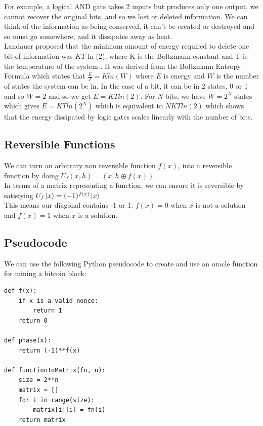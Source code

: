 \documentclass[11pt]{article} %
\begin{document}
\noindent For example, a logical AND gate takes 2 inputs but produces only one output, we cannot recover the original bits, and so we lost or deleted information.  We can think of the information as being conserved, it can't be created or destroyed and so must go somewhere, and it dissipates away as heat.\\

\noindent Landauer proposed that the minimum amount of energy required to delete one bit of information was $K T$ ln (2), where K is the Boltzmann constant and T is the temperature of the system \cite{19}. It was derived from the Boltzmann Entropy Formula which states that $\frac{E}{T} = K ln(W)$ where $E$ is energy and $W$ is the number of states the system can be in. In the case of a bit, it can be in 2 states, 0 or 1 and so $W = 2$ and so we get $E = K T ln(2)$. For $N$ bits, we have $W = 2^{N}$ states which gives $E = K T ln(2^N)$ which is equivalent to $N K T ln (2)$ which shows that the energy dissipated by logic gates scales linearly with the number of bits.\\

\subsection{Reversible Functions}{}


\noindent We can turn an arbitrary non reversible function $f(x)$, into a reversible function by doing $U_{f} (x, h) = (x, h \oplus  f(x))$. \\

\noindent In terms of a matrix representing a function, we can ensure it is reversible by satisfying $U_f \ket{x} = (-1)^{f(x)} \ket{x}$\\

\noindent This means our diagonal contains -1 or 1. $f(x) = 0$ when $x$ is not a solution and $f(x) = 1$ when $x$ is a solution.

 \subsection{Pseudocode}{}
We can use the following Python pseudocode to create and use an oracle function for mining a bitcoin block:
\begin{Verbatim}[tabsize=4]
def f(x):	
	if x is a valid nonce:
		return 1
	return 0

def phase(x):
	return (-1)**f(x)

def functionToMatrix(fn, n):
	size = 2**n
	matrix = []
	for i in range(size):
		matrix[i][i] = fn(i)
	return matrix
	
\end{Verbatim} 
\end{document}
